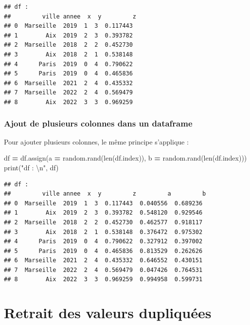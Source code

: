\documentclass[12pt,]{book}
\newenvironment{Shaded}{\begin{snugshade}}{\end{snugshade}}
\newcommand{\CharTok}[1]{\textcolor[rgb]{0.31,0.60,0.02}{#1}}
\newcommand{\StringTok}[1]{\textcolor[rgb]{0.31,0.60,0.02}{#1}}
\newcommand{\OperatorTok}[1]{\textcolor[rgb]{0.81,0.36,0.00}{\textbf{#1}}}
\newcommand{\BuiltInTok}[1]{#1}
\newcommand{\NormalTok}[1]{#1}
\numberwithin{equation}{section}
\numberwithin{countremarque}{section}
\begin{document}
\begin{lstlisting}
## df : 
##         ville annee  x  y         z
## 0  Marseille  2019  1  3  0.117443
## 1        Aix  2019  2  3  0.393782
## 2  Marseille  2018  2  2  0.452730
## 3        Aix  2018  2  1  0.538148
## 4      Paris  2019  0  4  0.790622
## 5      Paris  2019  0  4  0.465836
## 6  Marseille  2021  2  4  0.435332
## 7  Marseille  2022  2  4  0.569479
## 8        Aix  2022  3  3  0.969259
\end{lstlisting}

\subsubsection{Ajout de plusieurs colonnes dans un
dataframe}\label{ajout-de-plusieurs-colonnes-dans-un-dataframe}

Pour ajouter plusieurs colonnes, le même principe s'applique :

\begin{Shaded}
\begin{Highlighting}[]
\NormalTok{df }\OperatorTok{=}\NormalTok{ df.assign(a }\OperatorTok{=}\NormalTok{ random.rand(}\BuiltInTok{len}\NormalTok{(df.index)),}
\NormalTok{          b }\OperatorTok{=}\NormalTok{ random.rand(}\BuiltInTok{len}\NormalTok{(df.index)))}
\BuiltInTok{print}\NormalTok{(}\StringTok{"df : }\CharTok{\textbackslash{}n}\StringTok{"}\NormalTok{, df)}
\end{Highlighting}
\end{Shaded}

\begin{lstlisting}
## df : 
##         ville annee  x  y         z         a         b
## 0  Marseille  2019  1  3  0.117443  0.040556  0.689236
## 1        Aix  2019  2  3  0.393782  0.548120  0.929546
## 2  Marseille  2018  2  2  0.452730  0.462577  0.918117
## 3        Aix  2018  2  1  0.538148  0.376472  0.975302
## 4      Paris  2019  0  4  0.790622  0.327912  0.397002
## 5      Paris  2019  0  4  0.465836  0.813529  0.262626
## 6  Marseille  2021  2  4  0.435332  0.646552  0.430151
## 7  Marseille  2022  2  4  0.569479  0.047426  0.764531
## 8        Aix  2022  3  3  0.969259  0.994958  0.599731
\end{lstlisting}

\section{Retrait des valeurs
dupliquées}\label{retrait-des-valeurs-dupliquees}
\end{document}
